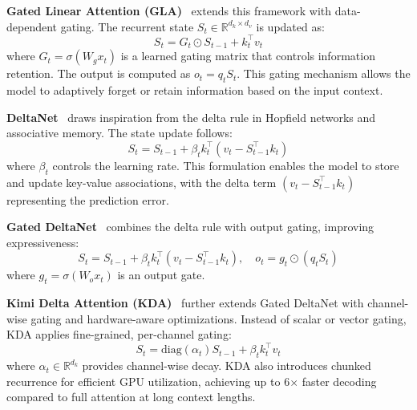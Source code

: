 \documentclass[runningheads]{llncs}
\begin{document}
\textbf{Gated Linear Attention (GLA)}~\cite{yang2024gated} extends this framework with data-dependent gating. The recurrent state $S_t \in \mathbb{R}^{d_k \times d_v}$ is updated as:
\begin{equation}
    S_t = G_t \odot S_{t-1} + k_t^\top v_t
\end{equation}
where $G_t = \sigma(W_g x_t)$ is a learned gating matrix that controls information retention. The output is computed as $o_t = q_t S_t$. This gating mechanism allows the model to adaptively forget or retain information based on the input context.

\textbf{DeltaNet}~\cite{schlag2021linear} draws inspiration from the delta rule in Hopfield networks and associative memory. The state update follows:
\begin{equation}
    S_t = S_{t-1} + \beta_t k_t^\top (v_t - S_{t-1}^\top k_t)
\end{equation}
where $\beta_t$ controls the learning rate. This formulation enables the model to store and update key-value associations, with the delta term $(v_t - S_{t-1}^\top k_t)$ representing the prediction error.

\textbf{Gated DeltaNet}~\cite{yang2024gated} combines the delta rule with output gating, improving expressiveness:
\begin{equation}
    S_t = S_{t-1} + \beta_t k_t^\top (v_t - S_{t-1}^\top k_t), \quad o_t = g_t \odot (q_t S_t)
\end{equation}
where $g_t = \sigma(W_o x_t)$ is an output gate.

\textbf{Kimi Delta Attention (KDA)}~\cite{team2025kimi} further extends Gated DeltaNet with channel-wise gating and hardware-aware optimizations. Instead of scalar or vector gating, KDA applies fine-grained, per-channel gating:
\begin{equation}
    S_t = \text{diag}(\alpha_t) S_{t-1} + \beta_t k_t^\top v_t
\end{equation}
where $\alpha_t \in \mathbb{R}^{d_k}$ provides channel-wise decay. KDA also introduces chunked recurrence for efficient GPU utilization, achieving up to 6$\times$ faster decoding compared to full attention at long context lengths.

\end{document}
